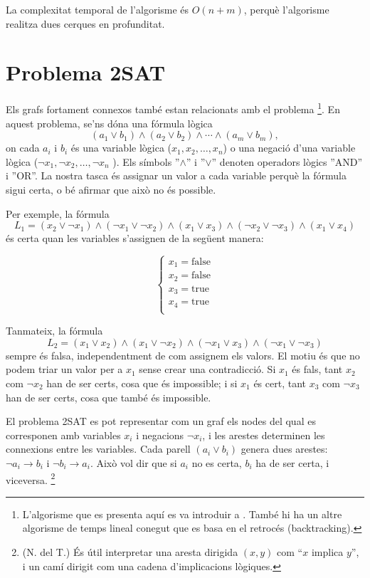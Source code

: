 La complexitat temporal de l'algorisme és $O(n+m)$, perquè l'algorisme realitza
dues cerques en profunditat.

\section{Problema 2SAT}


Els grafs fortament connexos també estan relacionats amb el problema
\footnote{L'algorisme que es presenta aquí es va introduir a
\cite{asp79}. També hi ha un altre algorisme de temps lineal conegut
\cite{eve75} que es basa en el retrocés (backtracking).}. En aquest
problema, se'ns dóna una fórmula lògica
\[
(a_1 \lor b_1) \land (a_2 \lor b_2) \land \cdots \land (a_m \lor b_m),
\]
on cada $a_i$ i $b_i$ és una variable lògica ($x_1,x_2,\ldots,x_n$) o
una negació d'una variable lògica ($\lnot x_1, \lnot x_2, \ldots,
\lnot x_n$ ). Els símbols ''$\land$'' i ''$\lor$'' denoten operadors
lògics ''AND'' i ''OR''. La nostra tasca és assignar un valor a cada
variable perquè la fórmula sigui certa, o bé afirmar que això no és
possible.

Per exemple, la fórmula
\[
L_1 = (x_2 \lor \lnot x_1) \land
      (\lnot x_1 \lor \lnot x_2) \land
      (x_1 \lor x_3) \land
      (\lnot x_2 \lor \lnot x_3) \land
      (x_1 \lor x_4)
\]
és certa quan les variables s'assignen de la següent manera:


\[
\begin{cases}
x_1 = \textrm{false} \\
x_2 = \textrm{false} \\
x_3 = \textrm{true} \\
x_4 = \textrm{true} \\
\end{cases}
\]


Tanmateix, la fórmula
\[
L_2 = (x_1 \lor x_2) \land
      (x_1 \lor \lnot x_2) \land
      (\lnot x_1 \lor x_3) \land
      (\lnot x_1 \lor \lnot x_3)
\]
sempre és falsa, independentment de com assignem els valors. El motiu
és que no podem triar un valor per a $x_1$ sense crear una
contradicció. Si $x_1$ és fals, tant $x_2$ com $\lnot x_2$ han de ser
certs, cosa que és impossible; i si $x_1$ és cert, tant $x_3$ com
$\lnot x_3$ han de ser certs, cosa que també és impossible.

El problema 2SAT es pot representar com un graf els nodes del qual es
corresponen amb variables $x_i$ i negacions $\lnot x_i$, i les arestes
determinen les connexions entre les variables.  Cada parell $(a_i \lor
b_i)$ genera dues arestes: $\lnot a_i \to b_i$ i $\lnot b_i \to
a_i$. Això vol dir que si $a_i$ no es certa, $b_i$ ha de ser certa, i
viceversa. \footnote{(N. del T.) És útil interpretar una aresta dirigida
$(x,y)$ com ``$x$ implica $y$'', i un camí dirigit com una cadena d'implicacions
lògiques.}

